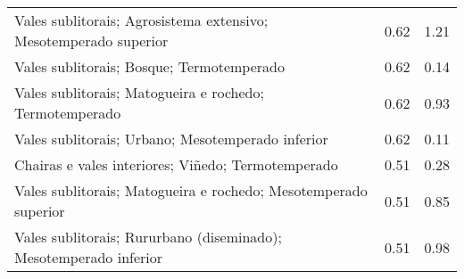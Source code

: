 \begin{table}[p]
\begin{tabular}{lrr}
  Vales sublitorais; Agrosistema extensivo; Mesotemperado superior & 0.62 & 1.21 \\ 
  Vales sublitorais; Bosque; Termotemperado & 0.62 & 0.14 \\ 
  Vales sublitorais; Matogueira e rochedo; Termotemperado & 0.62 & 0.93 \\ 
  Vales sublitorais; Urbano; Mesotemperado inferior & 0.62 & 0.11 \\ 
  Chairas e vales interiores; Viñedo; Termotemperado & 0.51 & 0.28 \\ 
  Vales sublitorais; Matogueira e rochedo; Mesotemperado superior & 0.51 & 0.85 \\ 
  Vales sublitorais; Rururbano (diseminado); Mesotemperado inferior & 0.51 & 0.98 \\ 
   \hline
\end{tabular}
\end{table}
